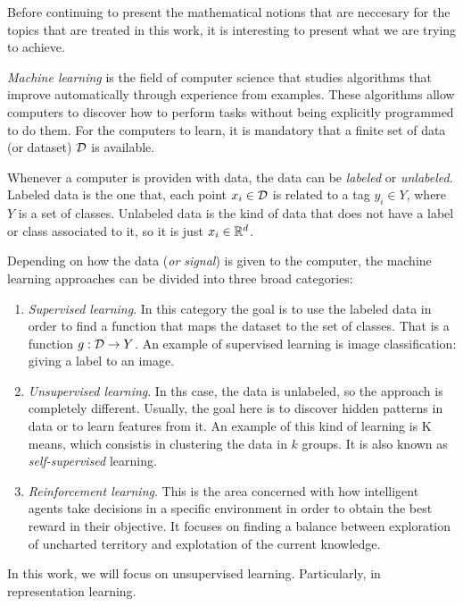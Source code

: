 


Before continuing to present the mathematical notions that are neccesary for the topics that are treated in this work, it is interesting to present what we are trying to achieve.

\emph{Machine learning} is the field of computer science that studies algorithms that improve automatically through experience from examples. 
These algorithms allow computers to discover how to
perform tasks without being explicitly programmed to do them. For the computers to learn, it is mandatory that a finite set of data (or dataset) $\mathcal{D}$ is available. 

Whenever a computer is providen with data, the data can be \emph{labeled} or \emph{unlabeled}. Labeled data is the one that, each point $x_i \in \mathcal{D}$ is related to a tag $y_i \in Y$, where $Y$ is a set of classes.
Unlabeled data is the kind of data that does not have a label or class associated to it, so it is just $x_i \in \mathbb{R}^d$. 

Depending on how the data (\emph{or signal}) is given to the computer, the machine learning approaches can be divided into three broad categories:
\begin{enumerate}
    \item \emph{Supervised learning}. In this category the goal is to use the labeled data in order to find a function that maps the dataset to the set of classes. That is a function $g:\mathcal{D} \to Y$. 
    An example of supervised learning is image classification: giving a label to an image.
    \item \emph{Unsupervised learning}. In ths case, the data is unlabeled, so the approach is completely different. Usually, the goal here is to discover hidden patterns in data or to learn features from it.
    An example of this kind of learning is K means, which consistis in clustering the data in $k$ groups. It is also known as \emph{self-supervised} learning.
    \item \emph{Reinforcement learning}. This is the area concerned with how intelligent agents take decisions in a specific environment in order to obtain the best reward in their objective. It focuses on finding a balance between exploration of uncharted territory and explotation of the current knowledge.

\end{enumerate}

In this work, we will focus on unsupervised learning. Particularly, in representation learning.

